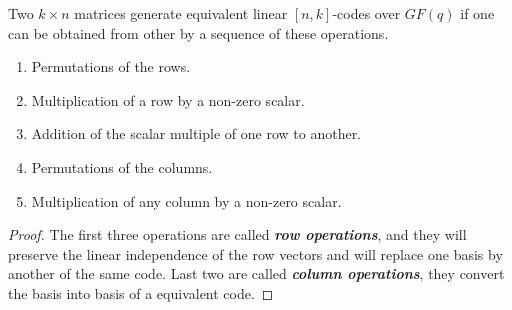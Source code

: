 \documentclass[../main.tex]{subfiles}
\begin{document}
\begin{thm}\label{thm_lc_equimatrices}
	Two $k\times n$ matrices generate equivalent linear $[n,k]$-codes over $GF(q)$ if one can be obtained from other by a sequence of these operations.
	\begin{enumerate}[label=(\roman*)]
	\itemsep-1mm
		\item Permutations of the rows.
		\item Multiplication of a row by a non-zero scalar.
		\item Addition of the scalar multiple of one row to another.
		\item Permutations of the columns.
		\item Multiplication of any column by a non-zero scalar.
	\end{enumerate}
\end{thm}
\begin{proof}
	The first three operations are called \textbf{\emph{row operations}}, and they will preserve the linear independence of the row vectors and will replace one basis by another of the same code. Last two are called \textbf{\emph{column operations}}, they convert the basis into basis of a equivalent code. 
\end{proof}
\end{document}
